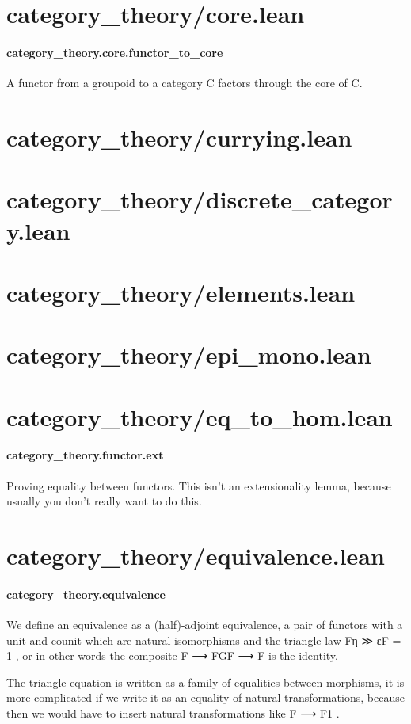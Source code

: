 \documentclass{article}
\begin{document}
\section{category\_theory/core.lean}\paragraph{category\_theory.core.functor\_to\_core}
\par
A functor from a groupoid to a category C factors through the core of C.
\section{category\_theory/currying.lean}\section{category\_theory/discrete\_category.lean}\section{category\_theory/elements.lean}\section{category\_theory/epi\_mono.lean}\section{category\_theory/eq\_to\_hom.lean}\paragraph{category\_theory.functor.ext}
\par
Proving equality between functors. This isn't an extensionality lemma,
because usually you don't really want to do this.
\section{category\_theory/equivalence.lean}\paragraph{category\_theory.equivalence}
\par
We define an equivalence as a (half)-adjoint equivalence, a pair of functors with
a unit and counit which are natural isomorphisms and the triangle law 
\colorbox[RGB]{253,246,227}{{{{\color[RGB]{101, 123, 131} Fη ≫ εF  }}}{{{\color[RGB]{181, 137, 0} = }}}{{{\color[RGB]{101, 123, 131}   }}}{{{\color[RGB]{108, 113, 196} 1 }}}}, or in other
words the composite 
\colorbox[RGB]{253,246,227}{{{{\color[RGB]{101, 123, 131} F ⟶ FGF ⟶ F }}}} is the identity.
\par
The triangle equation is written as a family of equalities between morphisms, it is more
complicated if we write it as an equality of natural transformations, because then we would have
to insert natural transformations like 
\colorbox[RGB]{253,246,227}{{{{\color[RGB]{101, 123, 131} F ⟶ F1 }}}}.
\end{document}

